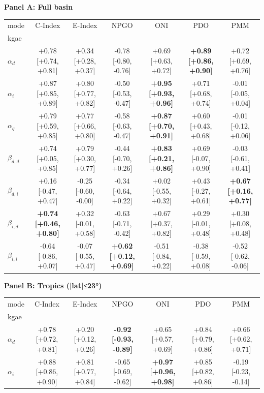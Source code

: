 \begin{table}[t]
\centering
\small
\setlength{\tabcolsep}{4pt}
\renewcommand{\arraystretch}{1.15}
\textbf{Panel A: Full basin}\\
\begin{tabular}{lcccccc}
\toprule
mode & C-Index & E-Index & NPGO & ONI & PDO & PMM \\
kgae &  &  &  &  &  &  \\
\midrule
$\alpha_{d}$ & +0.78 [+0.74, +0.81] & +0.34 [+0.28, +0.37] & -0.78 [-0.80, -0.76] & +0.69 [+0.63, +0.72] & \textbf{+0.89 [+0.86, +0.90]} & +0.72 [+0.69, +0.76] \\
$\alpha_{i}$ & +0.87 [+0.85, +0.89] & +0.80 [+0.77, +0.82] & -0.50 [-0.53, -0.47] & \textbf{+0.95 [+0.93, +0.96]} & +0.71 [+0.68, +0.74] & -0.01 [-0.05, +0.04] \\
$\alpha_{q}$ & +0.79 [+0.59, +0.85] & +0.77 [+0.66, +0.80] & -0.58 [-0.63, -0.47] & \textbf{+0.87 [+0.70, +0.91]} & +0.60 [+0.43, +0.68] & -0.01 [-0.12, +0.06] \\
$\beta_{d,d}$ & +0.74 [+0.05, +0.85] & +0.79 [+0.30, +0.77] & -0.44 [-0.70, +0.26] & \textbf{+0.83 [+0.21, +0.86]} & +0.69 [-0.07, +0.90] & -0.03 [-0.61, +0.41] \\
$\beta_{d,i}$ & +0.16 [-0.47, +0.47] & -0.25 [-0.60, -0.00] & -0.34 [-0.64, +0.22] & +0.02 [-0.55, +0.32] & +0.43 [-0.27, +0.61] & \textbf{+0.67 [+0.16, +0.77]} \\
$\beta_{i,d}$ & \textbf{+0.74 [+0.46, +0.80]} & +0.32 [-0.01, +0.58] & -0.63 [-0.71, -0.42] & +0.67 [+0.37, +0.82] & +0.29 [-0.01, +0.48] & +0.30 [+0.08, +0.48] \\
$\beta_{i,i}$ & -0.64 [-0.86, +0.07] & -0.07 [-0.55, +0.47] & \textbf{+0.62 [+0.12, +0.69]} & -0.51 [-0.84, +0.22] & -0.38 [-0.59, +0.08] & -0.52 [-0.62, -0.06] \\
\bottomrule
\end{tabular}
\vspace{0.6em}
\textbf{Panel B: Tropics (|lat|≤23°)}\\
\begin{tabular}{lcccccc}
\toprule
mode & C-Index & E-Index & NPGO & ONI & PDO & PMM \\
kgae &  &  &  &  &  &  \\
\midrule
$\alpha_{d}$ & +0.78 [+0.72, +0.81] & +0.20 [+0.12, +0.26] & \textbf{-0.92 [-0.93, -0.89]} & +0.65 [+0.57, +0.69] & +0.84 [+0.79, +0.86] & +0.66 [+0.62, +0.71] \\
$\alpha_{i}$ & +0.88 [+0.86, +0.90] & +0.81 [+0.77, +0.84] & -0.65 [-0.69, -0.62] & \textbf{+0.97 [+0.96, +0.98]} & +0.85 [+0.82, +0.86] & -0.19 [-0.23, -0.14] \\

\end{tabular}
\end{table}
